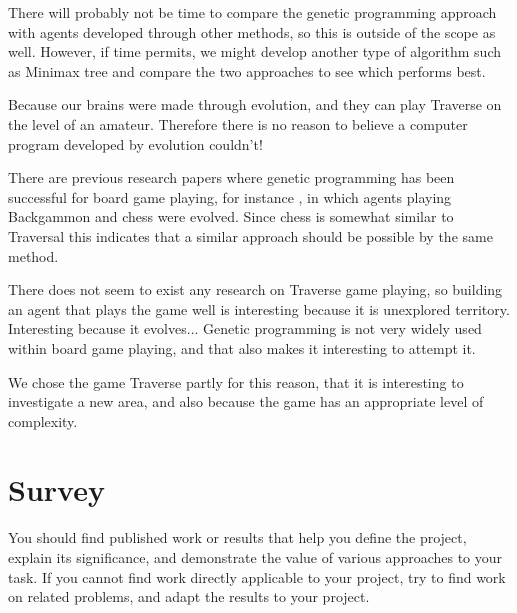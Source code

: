 \documentclass[times, 10pt,twocolumn]{article}
\begin{document}
There will probably not be time to compare the genetic programming approach with agents developed through other methods, so this is outside of the scope as well. However, if time permits, we might develop another type of algorithm such as Minimax tree and compare the two approaches to see which performs best.


Because our brains were made through evolution, and they can play Traverse on the level of an amateur. Therefore there is no reason to believe a computer program developed by evolution couldn't!

There are previous research papers where genetic programming has been successful for board game playing, for instance \cite{human-competitive_gp}, in which agents playing Backgammon and chess were evolved. Since chess is somewhat similar to Traversal this indicates that a similar approach should be possible by the same method.


There does not seem to exist any research on Traverse game playing, so building an agent that plays the game well is interesting because it is unexplored territory. Interesting because it evolves... Genetic programming is not very widely used within board game playing, and that also makes it interesting to attempt it.

We chose the game Traverse partly for this reason, that it is interesting to investigate a new area, and also because the game has an appropriate level of complexity.


\section{Survey}
You should find published work or results that help you define the project, explain its significance, and demonstrate the value of various approaches to your task. If you cannot find work directly applicable to your project, try to find work on related problems, and adapt the results to your project.
\end{document}
